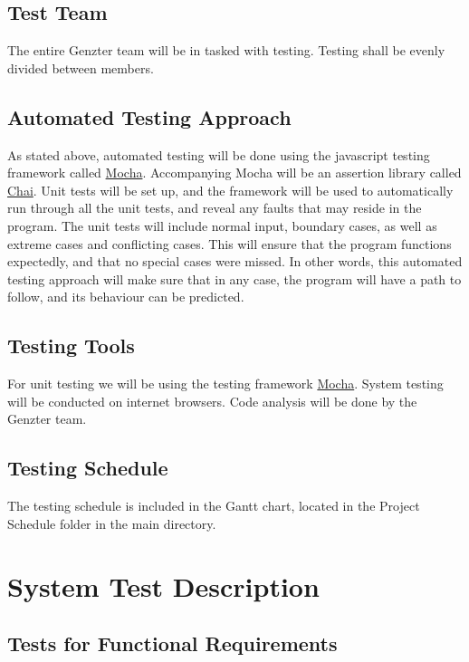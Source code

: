 \documentclass[11pt, oneside]{article}   	%
\begin{document}
\subsection{Test Team}
The entire Genzter team will be in tasked with testing. Testing shall be evenly divided between members.

\subsection{Automated Testing Approach}
As stated above, automated testing will be done using the javascript testing framework called \href{http://mochajs.org}{Mocha}. Accompanying Mocha will be an assertion library called \href{http://chaijs.com/}{Chai}. Unit tests will be set up, and the framework will be used to automatically run through all the unit tests, and reveal any faults that may reside in the program. The unit tests will include normal input, boundary cases, as well as extreme cases and conflicting cases. This will ensure that the program functions expectedly, and that no special cases were missed. In other words, this automated testing approach will make sure that in any case, the program will have a path to follow, and its behaviour can be predicted.

\subsection{Testing Tools}
For unit testing we will be using the testing framework \href{http://mochajs.org}{Mocha}. System testing will be conducted on internet browsers. Code analysis will be done by the Genzter team.

\subsection{Testing Schedule}
The testing schedule is included in the Gantt chart, located in the Project Schedule folder in the main directory.

\newpage

\section{System Test Description}
\subsection{Tests for Functional Requirements}
\end{document}
